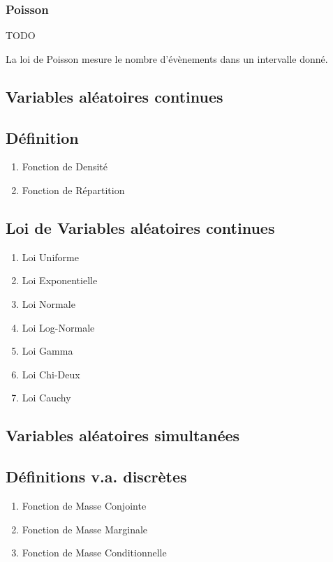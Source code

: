 \documentclass{article}
\begin{document}
\subsubsection{Poisson}%
\label{ssub:Poisson}

TODO

La loi de Poisson mesure le nombre d'évènements dans un intervalle donné.

\subsection{Variables aléatoires continues}

\subsection{Définition}

\begin{enumerate}
    \item Fonction de Densité
    \item Fonction de Répartition
\end{enumerate}

\subsection{Loi de Variables aléatoires continues}

\begin{enumerate}
    \item Loi Uniforme
    \item Loi Exponentielle
    \item Loi Normale
    \item Loi Log-Normale
    \item Loi Gamma
    \item Loi Chi-Deux
    \item Loi Cauchy
\end{enumerate}

\subsection{Variables aléatoires simultanées}

\subsection{Définitions v.a. discrètes}

\begin{enumerate}
    \item Fonction de Masse Conjointe
    \item Fonction de Masse Marginale
    \item Fonction de Masse Conditionnelle
\end{enumerate}
\end{document}

